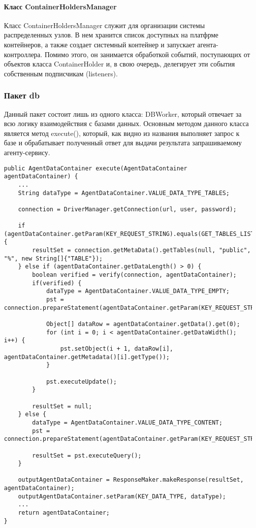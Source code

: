 \paragraph{Класс ContainerHoldersManager}
Класс ContainerHoldersManager служит для организации системы распределенных узлов. В нем хранится список доступных на платфрме контейнеров, а также создает системный контейнер и запускает агента-контроллера. Помимо этого, он занимается обработкой событий, поступающих от объектов класса ContainerHolder и, в свою очередь, делегирует эти события собственным подписчикам (listeners).

\subsubsection{Пакет db}
Данный пакет состоит лишь из одного класса: DBWorker, который отвечает за всю логику взаимодействия с базами данных. Основным методом данного класса является метод execute(), который, как видно из названия выполняет запрос к базе и обрабатывает полученный ответ для выдачи результата запрашиваемому агенту-сервису.
\begin{verbatim}
public AgentDataContainer execute(AgentDataContainer agentDataContainer) {
    ...
    String dataType = AgentDataContainer.VALUE_DATA_TYPE_TABLES;

    connection = DriverManager.getConnection(url, user, password);

    if (agentDataContainer.getParam(KEY_REQUEST_STRING).equals(GET_TABLES_LIST)) {
        resultSet = connection.getMetaData().getTables(null, "public", "%", new String[]{"TABLE"});
    } else if (agentDataContainer.getDataLength() > 0) {
        boolean verified = verify(connection, agentDataContainer);
        if(verified) {
            dataType = AgentDataContainer.VALUE_DATA_TYPE_EMPTY;
            pst = connection.prepareStatement(agentDataContainer.getParam(KEY_REQUEST_STRING));

            Object[] dataRow = agentDataContainer.getData().get(0);
            for (int i = 0; i < agentDataContainer.getDataWidth(); i++) {
                pst.setObject(i + 1, dataRow[i], agentDataContainer.getMetadata()[i].getType());
            }

            pst.executeUpdate();
        }

        resultSet = null;
    } else {
        dataType = AgentDataContainer.VALUE_DATA_TYPE_CONTENT;
        pst = connection.prepareStatement(agentDataContainer.getParam(KEY_REQUEST_STRING));

        resultSet = pst.executeQuery();
    }

    outputAgentDataContainer = ResponseMaker.makeResponse(resultSet, agentDataContainer);
    outputAgentDataContainer.setParam(KEY_DATA_TYPE, dataType);
    ...
    return agentDataContainer;
}
\end{verbatim}
